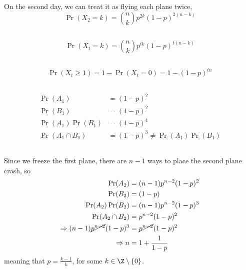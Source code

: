 \documentclass{article}
\begin{document}
\subsection{}

On the second day, we can treat it as flying each plane twice,
\begin{equation}
    \Pr(X_2 = k) = \binom{n}{k} p^{2k} (1 - p)^{2(n - k)}
\end{equation}

\subsection{}

\begin{equation}
    \Pr(X_t = k) = \binom{n}{k} p^{tk} (1 - p)^{t(n - k)}
\end{equation}

\subsection{}

\begin{equation}
    \Pr(X_t \geqslant 1) = 1 - \Pr(X_t = 0) = 1 - (1 - p)^{tn}
\end{equation}

\subsection{}

\begin{align}
    \Pr(A_1) &= (1 - p)^2 \\
    \Pr(B_1) &= (1 - p)^2 \\
    \Pr(A_1) \Pr(B_1) &= (1 - p)^4 \\
    \Pr(A_1 \cap B_1) &= (1 - p)^3 \neq \Pr(A_1) \Pr(B_1)
\end{align}

\subsection{}

Since we freeze the first plane, there are \(n - 1\) ways to place the second plane crash, so
\begin{align}
    \Pr(A_2) &= (n - 1) p^{n - 2} (1 - p)^2 \\
    \Pr(B_2) &= (1 - p) \\
    \Pr(A_2) \Pr(B_2) &= (n - 1) p^{n - 2} (1 - p)^3 \\
    \Pr(A_2 \cap B_2) &= p^{n - 2} (1 - p)^2 \\
    \Rightarrow (n - 1) \cancel{p^{n - 2}} (1 - p)^3 &= \cancel{p^{n - 2}} (1 - p)^2 \\
    \Rightarrow n &= 1 + \frac{1}{1 - p}
\end{align}
meaning that \(p = \frac{k - 1}{k}\), for some \(k \in \Z \setminus \{0\}\).
\end{document}
